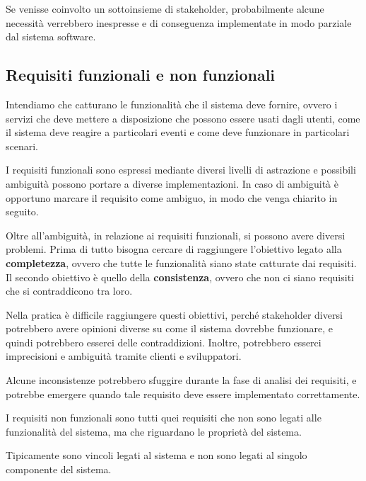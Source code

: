 Se venisse coinvolto un sottoinsieme di stakeholder, probabilmente alcune 
necessità verrebbero inespresse e di conseguenza implementate in modo parziale dal 
sistema software.
\subsection{Requisiti funzionali e non funzionali}
\begin{tcolorbox}[title = {Requisiti funzionali}]
Intendiamo che catturano le funzionalità che il sistema deve fornire, ovvero i servizi 
che deve mettere a disposizione che possono essere usati dagli utenti, come il sistema 
deve reagire a particolari eventi e come deve funzionare in particolari scenari. 
\end{tcolorbox}
I requisiti funzionali sono espressi mediante diversi livelli di astrazione e 
possibili ambiguità possono portare a diverse implementazioni. In caso di ambiguità è 
opportuno marcare il requisito come ambiguo, in modo che venga chiarito in seguito.

Oltre all'ambiguità, in relazione ai requisiti funzionali, si possono avere
diversi problemi. Prima di tutto bisogna cercare di raggiungere l'obiettivo legato 
alla \textbf{completezza}, ovvero che tutte le funzionalità siano state catturate
dai requisiti. Il secondo obiettivo è quello della \textbf{consistenza}, ovvero che
non ci siano requisiti che si contraddicono tra loro.

Nella pratica è difficile raggiungere questi obiettivi, perché stakeholder diversi
potrebbero avere opinioni diverse su come il sistema dovrebbe funzionare, e quindi
potrebbero esserci delle contraddizioni. Inoltre, potrebbero esserci imprecisioni
e ambiguità tramite clienti e sviluppatori.

Alcune inconsistenze potrebbero sfuggire durante la fase di analisi dei requisiti,
e potrebbe emergere quando tale requisito deve essere implementato correttamente.

\begin{tcolorbox}[title = {Requisiti non funzionali}]
I requisiti non funzionali sono tutti quei requisiti che non sono legati alle
funzionalità del sistema, ma che riguardano le proprietà del sistema.
\end{tcolorbox}
Tipicamente sono vincoli legati al sistema e non sono legati al singolo componente 
del sistema.

